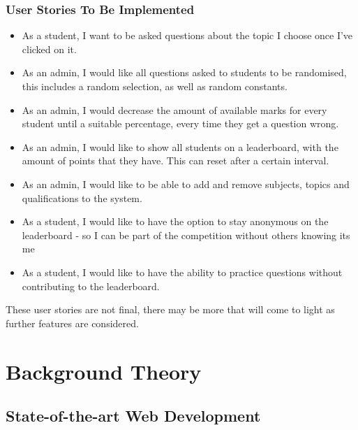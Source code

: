 \documentclass[]{final_report}
\begin{document}
\subsection{User Stories To Be Implemented}
	\begin{itemize}
		\item As a student, I want to be asked questions about the topic I choose once I've clicked on it.
		\item As an admin, I would like all questions asked to students to be randomised, this includes a random selection, as well as random constants.
		\item As an admin, I would decrease the amount of available marks for every student until a suitable percentage, every time they get a question wrong.
		\item As an admin, I would like to show all students on a leaderboard, with the amount of points that they have. This can reset after a certain interval.
		\item As an admin, I would like to be able to add and remove subjects, topics and qualifications to the system.
		\item As a student, I would like to have the option to stay anonymous on the leaderboard - so I can be part of the competition without others knowing its me
		\item As a student, I would like to have the ability to practice questions without contributing to the leaderboard.
	\end{itemize}
	
These user stories are not final, there may be more that will come to light as further features are considered.

\chapter{Background Theory}

\section{State-of-the-art Web Development}

\end{document}

